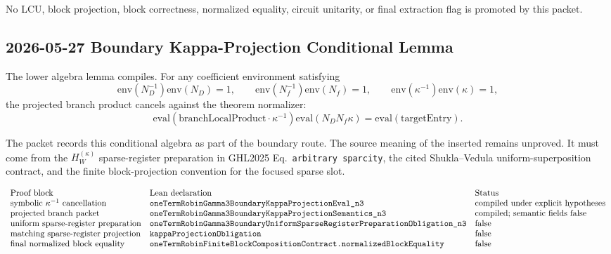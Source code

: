 No LCU, block projection, block correctness, normalized equality, circuit
unitarity, or final extraction flag is promoted by this packet.

\subsection{2026-05-27 Boundary Kappa-Projection Conditional Lemma}

The lower algebra lemma
compiles.  For any coefficient environment satisfying
\[
  \mathrm{env}(N_D^{-1})\mathrm{env}(N_D)=1,\qquad
  \mathrm{env}(N_f^{-1})\mathrm{env}(N_f)=1,\qquad
  \mathrm{env}(\kappa^{-1})\mathrm{env}(\kappa)=1,
\]
the projected branch product cancels against the theorem normalizer:
\[
  \mathrm{eval}(\text{branchLocalProduct}\cdot\kappa^{-1})
  \mathrm{eval}(N_DN_f\kappa)
  =
  \mathrm{eval}(\text{targetEntry}).
\]

The packet
records this conditional algebra as part of the boundary route.  The source
meaning of the inserted  remains unproved.  It
must come from the \(H_W^{(\kappa)}\) sparse-register preparation in GHL2025
Eq.~\texttt{arbitrary sparcity}, the cited Shukla--Vedula
uniform-superposition contract, and the finite block-projection convention for
the focused sparse slot.

\[
\begin{array}{lll}
\text{Proof block} & \text{Lean declaration} & \text{Status}\\
\text{symbolic } \kappa^{-1}\text{ cancellation} &
\texttt{oneTermRobinGamma3BoundaryKappaProjectionEval\_n3} &
\text{compiled under explicit hypotheses}\\
\text{projected branch packet} &
\texttt{oneTermRobinGamma3BoundaryKappaProjectionSemantics\_n3} &
\text{compiled; semantic fields false}\\
\text{uniform sparse-register preparation} &
\texttt{oneTermRobinGamma3BoundaryUniformSparseRegisterPreparationObligation\_n3} &
\text{false}\\
\text{matching sparse-register projection} &
\texttt{kappaProjectionObligation} &
\text{false}\\
\text{final normalized block equality} &
\texttt{oneTermRobinFiniteBlockCompositionContract.normalizedBlockEquality} &
\text{false}
\end{array}
\]

